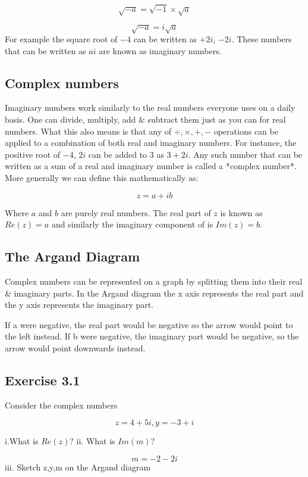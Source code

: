 \documentclass{book}
\begin{document}
$$ \sqrt{-a} = \sqrt{-1} \times \sqrt{a} $$

$$ \sqrt{-a} = i \sqrt{a} $$
For example the square root of $-4$ can be written as $+2i$, $-2i$.
These numbers that can be written as $ai$ are known as imaginary numbers. 

\subsection{ Complex numbers}

Imaginary numbers work similarly to the real numbers everyone uses on a  daily basis. One can divide, multiply, add \& subtract them just as you can for real numbers. What this also means is that any of $ \div ,\times, +, - $ operations can be applied to a combination of both real and imaginary numbers. For instance, the positive root of $-4$, $2i$ can be added to $3$ as $3 + 2i $. Any such number that can be written as a sum of a real and imaginary number is called a *complex number*. More generally we can define this mathematically as:

$$ z = a + ib $$

Where $a$ and $b$ are purely real numbers. The real part of $z$ is known as $ Re(z) = a$ and similarly the imaginary component of is $ Im(z) = b$. 

\subsection{ The Argand Diagram}

Complex numbers can be represented on a graph by splitting them into their real \& imaginary parts. In the Argand diagram the x axis represents the real part and the y axis represents the imaginary part. 



If a were negative, the real part would be negative so the arrow would point to the left instead. If b were negative, the imaginary part would be negative, so the arrow would point downwards instead. 


\subsection{Exercise 3.1}

Consider the complex numbers 

$$ z = 4 + 5i , y = -3 + i $$

i.What is $Re(z)$? 
ii. What is $Im(m)$? 

$$m = -2 - 2i $$ 
iii. Sketch z,y,m on the Argand diagram 
\hline
\end{document}

